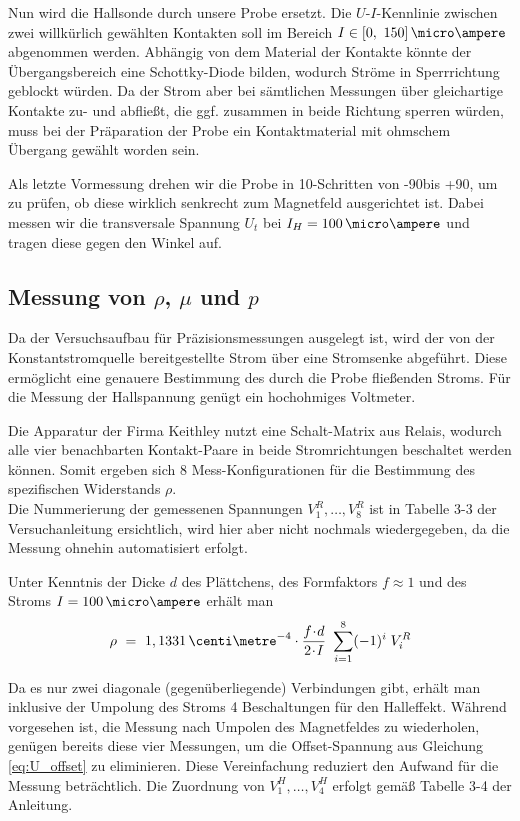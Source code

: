 Nun wird die Hallsonde durch unsere Probe ersetzt. Die $U$-$I$-Kennlinie zwischen zwei willkürlich gewählten Kontakten soll im Bereich $I \in [0,~150]\,\micro\ampere$ abgenommen werden. Abhängig von dem Material der Kontakte könnte der Übergangsbereich eine Schottky-Diode bilden, wodurch Ströme in Sperrrichtung geblockt würden. Da der Strom aber bei sämtlichen Messungen über gleichartige Kontakte zu- und abfließt, die ggf. zusammen in beide Richtung sperren würden, muss bei der Präparation der Probe ein Kontaktmaterial mit ohmschem Übergang gewählt worden sein.

Als letzte Vormessung drehen wir die Probe in 10\degree-Schritten von -90\degree bis +90\degree, um zu prüfen, ob diese wirklich senkrecht zum Magnetfeld ausgerichtet ist. Dabei messen wir die transversale Spannung $U_t$ bei $I_H = 100\,\micro\ampere$ und tragen diese gegen den Winkel auf.


\newpage
\subsection{Messung von $\rho$, $\mu$ und $p$}

Da der Versuchsaufbau für Präzisionsmessungen ausgelegt ist, wird der von der Konstantstromquelle bereitgestellte Strom über eine Stromsenke abgeführt. Diese ermöglicht eine genauere Bestimmung des durch die Probe fließenden Stroms. Für die Messung der Hallspannung genügt ein hochohmiges Voltmeter.

Die Apparatur der Firma Keithley nutzt eine Schalt-Matrix aus Relais, wodurch alle vier benachbarten Kontakt-Paare in beide Stromrichtungen beschaltet werden können. Somit ergeben sich 8 Mess-Konfigurationen für die Bestimmung des spezifischen Widerstands $\rho$.\\
Die Nummerierung der gemessenen Spannungen $V^R_1, \dots, V^R_8$ ist in Tabelle 3-3 der Versuchanleitung ersichtlich, wird hier aber nicht nochmals wiedergegeben, da die Messung ohnehin automatisiert erfolgt.

Unter Kenntnis der Dicke $d$ des Plättchens, des Formfaktors $f \approx 1$ und des Stroms  $I = 100\,\micro\ampere$ erhält man\\[-1.2em]
\begin{equation}
\rho ~=~ 1,1331 \,\centi\metre^{-4} \cdot \frac{f \cdt d}{2 \cdt I} ~ \sum\limits_{i=1}^8 (-1)^i \; V^R_i
\end{equation}

Da es nur zwei \glqq diagonale\grqq{} (gegenüberliegende) Verbindungen gibt, erhält man inklusive der Umpolung des Stroms 4 Beschaltungen für den Halleffekt. Während vorgesehen ist, die Messung nach Umpolen des Magnetfeldes zu wiederholen, genügen bereits diese vier Messungen, um die Offset-Spannung aus Gleichung \eqref{eq:U_offset} zu eliminieren. Diese Vereinfachung reduziert den Aufwand für die Messung beträchtlich. Die Zuordnung von $V^H_1, \dots, V^H_4$ erfolgt gemäß Tabelle 3-4 der Anleitung.

